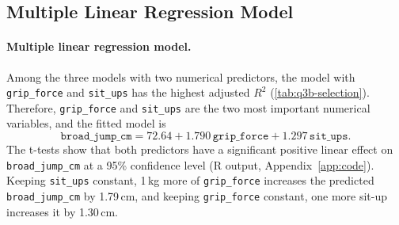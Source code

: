 \subsection{Multiple Linear Regression Model}\label{sec:q3b}


\paragraph{Multiple linear regression model.}
Among the three models with two numerical predictors, the model with \texttt{grip\_force} and \texttt{sit\_ups} has the highest adjusted $R^2$ (\autoref{tab:q3b-selection}).
Therefore, \texttt{grip\_force} and \texttt{sit\_ups} are the two most important numerical variables, and the fitted model is
\[
  \texttt{broad\_jump\_cm} = 72.64 + 1.790\,\texttt{grip\_force} + 1.297\,\texttt{sit\_ups}.
\]
The t-tests show that both predictors have a significant positive linear effect on \texttt{broad\_jump\_cm} at a 95\% confidence level (R output, Appendix~\ref{app:code}).
Keeping \texttt{sit\_ups} constant, 1\,kg more of \texttt{grip\_force} increases the predicted \texttt{broad\_jump\_cm} by 1.79\,cm, and keeping \texttt{grip\_force} constant, one more sit-up increases it by 1.30\,cm.

